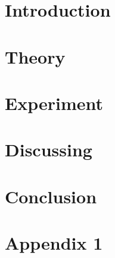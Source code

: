 \documentclass[final,danish]{packages/DocLayout} %
\begin{document}
	
        
        
    \tableofcontents
        
    
    \pagestyle{scrheadings} 
    
    \chapter{Introduction}
        
    
    \chapter{Theory}
        
    
    \chapter{Experiment}
    
    \chapter{Discussing}
    
    \chapter{Conclusion}
    
    \printbibliography
    
    \appendix
    
    \chapter{Appendix 1}
    
\end{document}
